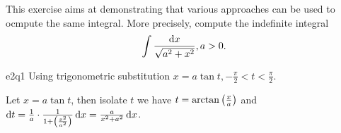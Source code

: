 \documentclass[reqno]{alittlebear}
\begin{document}
\newpage
{}
\begin{exercise}{}{}
    \begin{note}
        This exercise aims at demonstrating that various approaches can be used to ocmpute the same integral. More precisely, compute the indefinite integral \[\int \frac{\mathop{}\!\mathrm{d} x}{\sqrt{a^2+x^2}}, a>0.\]
    \end{note}
    \begin{question}{}{e2q1}
        Using trigonometric substitution $x=a\tan t,  -\frac\pi2<t<\frac\pi2$.
        \qbreak
        \begin{mathnote}
            Let $x=a\tan t$, then isolate $t$ we have $t=\arctan\left(\frac{x}{a}\right)$ and $\mathop{}\!\mathrm{d} t=\frac1a\cdot\frac{1}{1+\left(\frac{x^2}{a^2}\right)}\mathop{}\!\mathrm{d} x=\frac{a}{x^2+a^2}\mathop{}\!\mathrm{d} x$. 
            \begin{center}
\end{center}
\end{mathnote}
\end{question}
\end{exercise}
\end{document}
